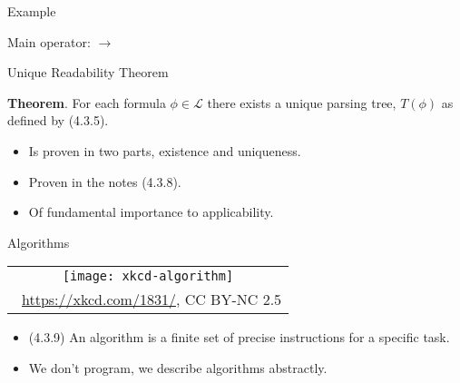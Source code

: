 \begin{frame}{Example}

\begin{center}

Main operator: $\to$
\end{center}

\end{frame}

\begin{frame}{Unique Readability Theorem}

	\textbf{Theorem}. For each formula $\phi\in\mathcal{L}$ there exists a unique parsing tree, $T(\phi)$ as defined by (4.3.5).

	\begin{itemize}
	
		\item Is proven in two parts, existence and uniqueness.
		
		\item Proven in the notes (4.3.8).
		
		\item Of fundamental importance to applicability.
	
	\end{itemize}


\end{frame}

\begin{frame}{Algorithms}

\begin{center}
		\begin{tabular}{c}
		\texttt{[image: xkcd-algorithm]}\\[-1ex]
		{\tiny \textcopyright~\url{https://xkcd.com/1831/}, CC BY-NC 2.5}
		\end{tabular}
		\end{center}

	\begin{itemize}
	
		\item (4.3.9) An algorithm is a finite set of precise instructions for a specific task. 
	
		\item We don't program, we describe algorithms abstractly.
	
	\end{itemize}

\end{frame}

